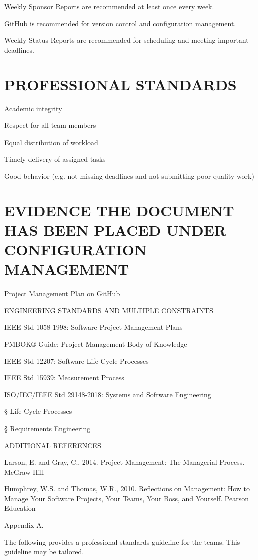 \documentclass[11pt]{article}
\begin{document}
Weekly Sponsor Reports are recommended at least once every week.

GitHub is recommended for version control and configuration management.

Weekly Status Reports are recommended for scheduling and meeting important deadlines.

\section{PROFESSIONAL STANDARDS}
Academic integrity

Respect for all team members

Equal distribution of workload

Timely delivery of assigned tasks

Good behavior (e.g. not missing deadlines and not submitting poor quality work)

\section{EVIDENCE THE DOCUMENT HAS BEEN PLACED UNDER CONFIGURATION MANAGEMENT}
\href{https://github.com/cchung7/rtx_team1/blob/main/group1-Project%20Management%20Plan.docx}{\underline{Project Management Plan on GitHub}}

ENGINEERING STANDARDS AND MULTIPLE CONSTRAINTS

IEEE Std 1058-1998: Software Project Management Plans 

PMBOK® Guide: Project Management Body of Knowledge 

IEEE Std 12207: Software Life Cycle Processes 

IEEE Std 15939: Measurement Process 

ISO/IEC/IEEE Std 29148-2018: Systems and Software Engineering

§  Life Cycle Processes

§  Requirements Engineering 

ADDITIONAL REFERENCES

Larson, E. and Gray, C., 2014. Project Management: The Managerial Process. McGraw Hill

Humphrey, W.S. and Thomas, W.R., 2010. Reflections on Management: How to Manage Your Software Projects, Your Teams, Your Boss, and Yourself. Pearson Education

Appendix A.

The following provides a professional standards guideline for the teams. This guideline may be tailored.
\end{document}

